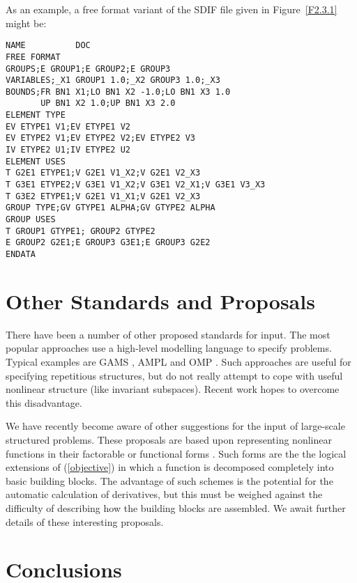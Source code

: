 \documentclass[a4paper]{article}
\newcommand{\req}[1]{(\ref{#1})}
\begin{document}
As an example, a free format
variant of the SDIF file given in Figure~\ref{F2.3.1} might be:
{\renewcommand{\arraystretch}{0.8} {\small {\tt \begin{verbatim}
NAME          DOC
FREE FORMAT
GROUPS;E GROUP1;E GROUP2;E GROUP3
VARIABLES;_X1 GROUP1 1.0;_X2 GROUP3 1.0;_X3
BOUNDS;FR BN1 X1;LO BN1 X2 -1.0;LO BN1 X3 1.0
       UP BN1 X2 1.0;UP BN1 X3 2.0
ELEMENT TYPE
EV ETYPE1 V1;EV ETYPE1 V2
EV ETYPE2 V1;EV ETYPE2 V2;EV ETYPE2 V3
IV ETYPE2 U1;IV ETYPE2 U2
ELEMENT USES
T G2E1 ETYPE1;V G2E1 V1_X2;V G2E1 V2_X3
T G3E1 ETYPE2;V G3E1 V1_X2;V G3E1 V2_X1;V G3E1 V3_X3
T G3E2 ETYPE1;V G2E1 V1_X1;V G2E1 V2_X3
GROUP TYPE;GV GTYPE1 ALPHA;GV GTYPE2 ALPHA
GROUP USES
T GROUP1 GTYPE1; GROUP2 GTYPE2
E GROUP2 G2E1;E GROUP3 G3E1;E GROUP3 G2E2
ENDATA
\end{verbatim} }}}

\section{\label{S6}Other Standards and Proposals}
\setcounter{figure}{0}

There have been a number of  other proposed  standards for input.  The
most popular approaches use a high-level modelling language
to specify problems. Typical examples are GAMS
\cite{GAMS88},  AMPL
\cite{FourGayKern87}
and OMP \cite{OMP87}.   Such  approaches are  useful  for  specifying
repetitious structures,
but do not really attempt  to cope with useful
nonlinear structure (like invariant subspaces).
Recent work \cite{FourGayKern89}  hopes   to overcome  this
disadvantage.

We have  recently become aware  of other suggestions for  the input of
large-scale   structured
problems. These  proposals   are based upon
representing nonlinear functions in  their factorable \cite{Lena89} or
functional forms \cite{McCoRahn89}.  Such forms   are the the  logical
extensions of \req{objective}    in which  a function  is   decomposed
completely into basic building blocks.  The  advantage of such schemes
is the  potential for the  automatic  calculation of  derivatives,
but this must be weighed against the difficulty  of describing how the
building  blocks are assembled.    We  await further details  of these
interesting proposals.

\section{\label{S7}Conclusions}
\setcounter{figure}{0}
\end{document}
